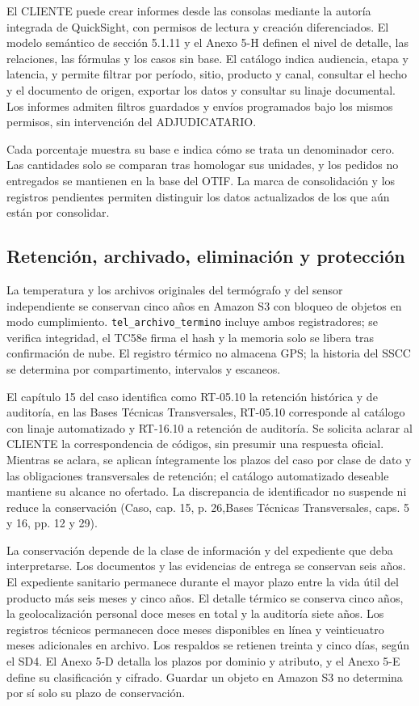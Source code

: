 El CLIENTE puede crear informes desde las consolas mediante la autoría integrada de QuickSight, con permisos de lectura y creación diferenciados. El modelo semántico de sección 5.1.11 y el Anexo 5-H definen el nivel de detalle, las relaciones, las fórmulas y los casos sin base. El catálogo indica audiencia, etapa y latencia, y permite filtrar por período, sitio, producto y canal, consultar el hecho y el documento de origen, exportar los datos y consultar su linaje documental. Los informes admiten filtros guardados y envíos programados bajo los mismos permisos, sin intervención del ADJUDICATARIO.

Cada porcentaje muestra su base e indica cómo se trata un denominador cero. Las cantidades solo se comparan tras homologar sus unidades, y los pedidos no entregados se mantienen en la base del OTIF. La marca de consolidación y los registros pendientes permiten distinguir los datos actualizados de los que aún están por consolidar.

\subsection{Retención, archivado, eliminación y protección}
\label{sec:sd5-5-2-7}

La temperatura y los archivos originales del termógrafo y del sensor independiente se conservan cinco años en Amazon S3 con bloqueo de objetos en modo cumplimiento. \texttt{tel\_\allowbreak{}archivo\_\allowbreak{}termino} incluye ambos registradores; se verifica integridad, el TC58e firma el hash y la memoria solo se libera tras confirmación de nube. El registro térmico no almacena GPS; la historia del SSCC se determina por compartimento, intervalos y escaneos.

El capítulo 15 del caso identifica como RT-05.10 la retención histórica y de auditoría, en las Bases Técnicas Transversales, RT-05.10 corresponde al catálogo con linaje automatizado y RT-16.10 a retención de auditoría. Se solicita aclarar al CLIENTE la correspondencia de códigos, sin presumir una respuesta oficial. Mientras se aclara, se aplican íntegramente los plazos del caso por clase de dato y las obligaciones transversales de retención; el catálogo automatizado deseable mantiene su alcance no ofertado. La discrepancia de identificador no suspende ni reduce la conservación (Caso, cap. 15, p. 26,Bases Técnicas Transversales, caps. 5 y 16, pp. 12 y 29).

La conservación depende de la clase de información y del expediente que deba interpretarse. Los documentos y las evidencias de entrega se conservan seis años. El expediente sanitario permanece durante el mayor plazo entre la vida útil del producto más seis meses y cinco años. El detalle térmico se conserva cinco años, la geolocalización personal doce meses en total y la auditoría siete años. Los registros técnicos permanecen doce meses disponibles en línea y veinticuatro meses adicionales en archivo. Los respaldos se retienen treinta y cinco días, según el SD4. El Anexo 5-D detalla los plazos por dominio y atributo, y el Anexo 5-E define su clasificación y cifrado. Guardar un objeto en Amazon S3 no determina por sí solo su plazo de conservación.

